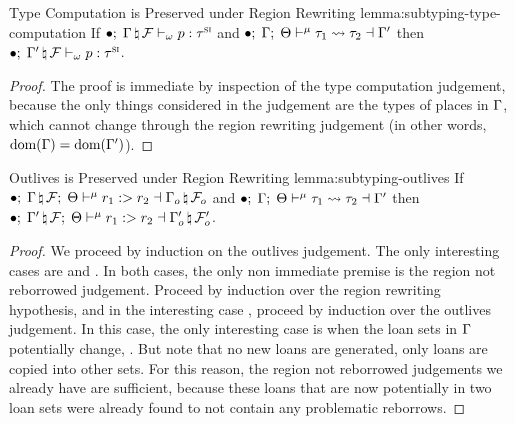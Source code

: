 \begin{oxlemma}{Type Computation is Preserved under Region Rewriting}
  {lemma:subtyping-type-computation} If
  $ \bullet; \; \Gamma \, \natural \, \mathcal{F} \vdash_{\omega} p : \tau^\textsc{si} $
  and
  $\bullet; \; \Gamma; \; \Theta \vdash^{\mu} \tau_1 \leadsto \tau_2 \dashv \Gamma^\prime$
  then
  $ \bullet; \; \Gamma^\prime \, \natural \, \mathcal{F} \vdash_{\omega} p : \tau^\textsc{si} $.
\end{oxlemma}

\begin{proof}
  The proof is immediate by inspection of the type computation judgement,
  because the only things considered in the judgement are the types of places in
  $\Gamma$, which cannot change through the region rewriting judgement (in
  other words, $\textrm{dom}(\Gamma) = \textrm{dom}(\Gamma^\prime)$).
\end{proof}

\begin{oxlemma}{Outlives is Preserved under Region Rewriting}
  {lemma:subtyping-outlives} If $\bullet; \; \Gamma \, \natural \, \mathcal{F}; \; \Theta \vdash^{\mu} r_1 :> r_2 \dashv \Gamma_o \, \natural \, \mathcal{F}_o$ and
  $\bullet; \; \Gamma; \; \Theta \vdash^{\mu} \tau_1 \leadsto \tau_2 \dashv \Gamma^\prime$ then
  $\bullet; \; \Gamma^\prime \, \natural \, \mathcal{F}; \; \Theta \vdash^{\mu} r_1 :> r_2 \dashv \Gamma_o^\prime \, \natural \, \mathcal{F}_o^\prime$.
\end{oxlemma}
\begin{proof}
  We proceed by induction on the outlives judgement. The only interesting cases
  are  and . In both cases,
  the only non immediate premise is the region not reborrowed judgement. Proceed
  by induction over the region rewriting hypothesis, and in the interesting case
  , proceed by induction over the outlives judgement. In
  this case, the only interesting case is when the loan sets in $\Gamma$
  potentially change, . But note that no new loans
  are generated, only loans are copied into other sets. For this reason, the
  region not reborrowed judgements we already have are sufficient, because these
  loans that are now potentially in two loan sets were already found to not
  contain any problematic reborrows.
\end{proof}

